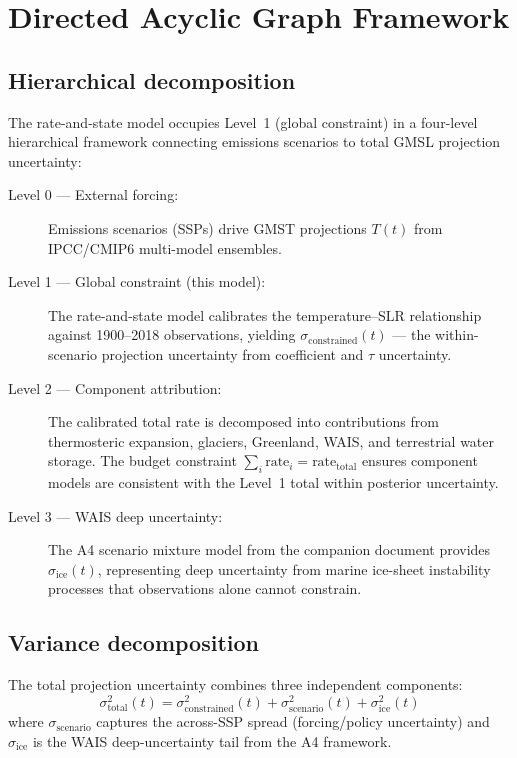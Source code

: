 \documentclass[11pt]{article}
\begin{document}
\section{Directed Acyclic Graph Framework}
\label{sec:dag}

\subsection{Hierarchical decomposition}

The rate-and-state model occupies Level~1 (global constraint) in a four-level hierarchical framework connecting emissions scenarios to total GMSL projection uncertainty:

\begin{description}
  \item[Level 0 --- External forcing:] Emissions scenarios (SSPs) drive GMST projections $T(t)$ from IPCC/CMIP6 multi-model ensembles.

  \item[Level 1 --- Global constraint (this model):] The rate-and-state model calibrates the temperature--SLR relationship against 1900--2018 observations, yielding $\sigma_{\text{constrained}}(t)$ --- the within-scenario projection uncertainty from coefficient and $\tau$ uncertainty.

  \item[Level 2 --- Component attribution:] The calibrated total rate is decomposed into contributions from thermosteric expansion, glaciers, Greenland, WAIS, and terrestrial water storage.  The budget constraint $\sum_i \text{rate}_i = \text{rate}_{\text{total}}$ ensures component models are consistent with the Level~1 total within posterior uncertainty.

  \item[Level 3 --- WAIS deep uncertainty:] The A4 scenario mixture model from the companion document provides $\sigma_{\text{ice}}(t)$, representing deep uncertainty from marine ice-sheet instability processes that observations alone cannot constrain.
\end{description}

\subsection{Variance decomposition}

The total projection uncertainty combines three independent components:
\begin{equation}
  \sigma_{\text{total}}^2(t) = \sigma_{\text{constrained}}^2(t) + \sigma_{\text{scenario}}^2(t) + \sigma_{\text{ice}}^2(t)
  \label{eq:var_decomp}
\end{equation}
where $\sigma_{\text{scenario}}$ captures the across-SSP spread (forcing/policy uncertainty) and $\sigma_{\text{ice}}$ is the WAIS deep-uncertainty tail from the A4 framework.
\end{document}
